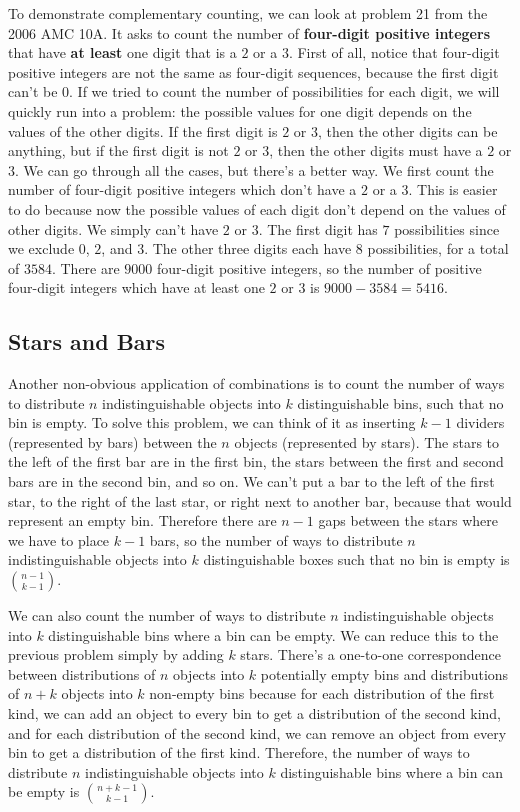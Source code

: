 \documentclass[twocolumn]{article}
\begin{document}
To demonstrate complementary counting, we can look at problem 21 from the 2006 
AMC 10A. It asks to count the number of \textbf{four-digit positive integers} 
that have \textbf{at least} one digit that is a $2$ or a $3$. First of all, 
notice that four-digit positive integers are not the same as four-digit 
sequences, because the first digit can't be $0$. If we tried to count the number 
of possibilities for each digit, we will quickly run into a problem: the 
possible values for one digit depends on the values of the other digits. If the 
first digit is $2$ or $3$, then the other digits can be anything, but if the 
first digit is not $2$ or $3$, then the other digits must have a $2$ or $3$. We 
can go through all the cases, but there's a better way. We first count the 
number of four-digit positive integers which don't have a $2$ or a $3$. This is 
easier to do because now the possible values of each digit don't depend on the 
values of other digits. We simply can't have $2$ or $3$. The first digit has $7$ 
possibilities since we exclude $0$, $2$, and $3$. The other three digits each 
have $8$ possibilities, for a total of $3584$. There are $9000$ four-digit 
positive integers, so the number of positive four-digit integers which have at 
least one $2$ or $3$ is $9000 - 3584 = 5416$.

\subsection*{Stars and Bars}
Another non-obvious application of combinations is to count the number of ways 
to distribute $n$ indistinguishable objects into $k$ distinguishable bins, such 
that no bin is empty. To solve this problem, we can think of it as inserting $k 
- 1$ dividers (represented by bars) between the $n$ objects (represented by 
stars). The stars to the left of the first bar are in the first bin, the stars 
between the first and second bars are in the second bin, and so on. We can't put 
a bar to the left of the first star, to the right of the last star, or right 
next to another bar, because that would represent an empty bin. Therefore there 
are $n - 1$ gaps between the stars where we have to place $k - 1$ bars, so the 
number of ways to distribute $n$ indistinguishable objects into $k$ 
distinguishable boxes such that no bin is empty is $\binom{n - 1}{k - 1}$.

We can also count the number of ways to distribute $n$ indistinguishable objects 
into $k$ distinguishable bins where a bin can be empty. We can reduce this to 
the previous problem simply by adding $k$ stars. There's a one-to-one 
correspondence between distributions of $n$ objects into $k$ potentially empty 
bins and distributions of $n + k$ objects into $k$ non-empty bins because for 
each distribution of the first kind, we can add an object to every bin to get a 
distribution of the second kind, and for each distribution of the second kind, 
we can remove an object from every bin to get a distribution of the first kind. 
Therefore, the number of ways to distribute $n$ indistinguishable objects into 
$k$ distinguishable bins where a bin can be empty is $\binom{n + k - 1}{k - 1}$.
\end{document}
